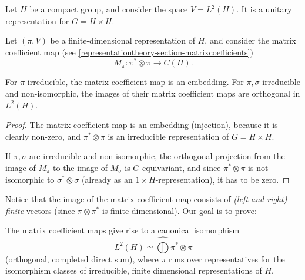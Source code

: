 Let $H$ be a compact group, and consider the space $V=L^2(H)$. It is a unitary representation for $G=H\times H$. 

Let $(\pi, V)$ be a finite-dimensional representation of $H$, and consider the matrix coefficient map (see \ref{representationtheory-section-matrixcoefficients})
$$ M_\pi: \pi^*\otimes \pi \to C(H).$$

\begin{lemma}
\label{lemma-matrixcoefficient}
For $\pi$ irreducible, the matrix coefficient map is an embedding. For $\pi, \sigma$ irreducible and non-isomorphic, the images of their matrix coefficient maps are orthogonal in $L^2(H)$.
\end{lemma}

\begin{proof}
 The matrix coefficient map is an embedding (injection), because it is clearly non-zero, and $\pi^*\otimes\pi$ is an irreducible representation of $G=H\times H$.
 
 If $\pi, \sigma$ are irreducible and non-isomorphic, the orthogonal projection from the image of $M_\pi$ to the image of $M_\sigma$ is $G$-equivariant, and since $\pi^*\otimes \pi$ is not isomorphic to $\sigma^*\otimes \sigma$ (already as an $1\times H$-representation), it has to be zero.
\end{proof}


Notice that the image of the matrix coefficient map consists of \emph{(left and right) finite} vectors (since $\pi\otimes\pi^*$ is finite dimensional). Our goal is to prove:

\begin{theorem}
\label{theorem-PeterWeyl}
The matrix coefficient maps give rise to a canonical isomorphism
\begin{equation}
 \label{equation-PeterWeyl}
 L^2(H)\simeq \hat\bigoplus \pi^*\otimes \pi
\end{equation}
(orthogonal, completed direct sum),
where $\pi$ runs over representatives for the isomorphism classes of irreducible, finite dimensional representations of $H$.
\end{theorem}


